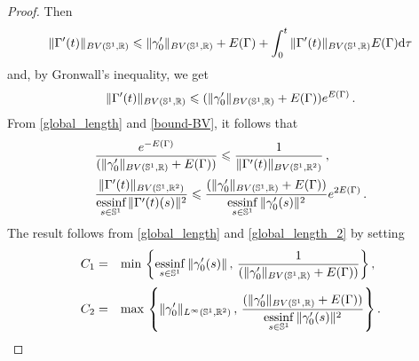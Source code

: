 \begin{proof}
Then
$$\|\Gamma'(t)\|_{BV(\mathbb{S}^1,\mathbb{R})}\leqslant  \|\gamma_0'\|_{BV(\mathbb{S}^1,\mathbb{R})}+E(\Gamma) +   \int_0^t \|\Gamma'(t)\|_{BV(\mathbb{S}^1,\mathbb{R})}E(\Gamma) \mathrm{d} \tau$$
and, by  Gronwall's inequality, we get 
\begin{equation}\label{bound-BV}
\|\Gamma'(t)\|_{BV(\mathbb{S}^1,\mathbb{R})}\leqslant (\|\gamma_0'\|_{BV(\mathbb{S}^1,\mathbb{R})}+E(\Gamma))e^{E(\Gamma)}\,.
\end{equation} 
From \eqref{global_length} and \eqref{bound-BV}, it follows  that 
\begin{equation}\label{global_length_2}
\begin{array}{ll}
\displaystyle{\frac{e^{-E(\GA) }}{ (\|\gm_0'\|_{BV(\Circ,\RR)}+E(\GA))}	\leq \frac{1}{\|\GA'(t)\|_{BV(\Circ,\RR^2)}}}\,, \vspace{0.2cm}\\
\displaystyle{\frac{\|\GA'(t)\|_{BV(\Circ,\RR^2)}}{\underset{s\in\Circ}{\mbox{essinf}}\,\|\GA'(t)(s)\|^2} \leq 	\frac{(\|\gm_0'\|_{BV(\Circ,\RR)}+E(\GA))}{\underset{s\in \Circ}{\rm{essinf}}\,\|\gm_0'(s)\|^2}}e^{2E(\GA)}\,.
\end{array}
\end{equation}
The result follows from \eqref{global_length} and \eqref{global_length_2} by setting
\begin{equation}\label{C1C2}
\begin{array}{ll}
C_1= &\displaystyle{ \min\, \left\{ \underset{s\in \Circ}{\rm{essinf}}\,\|\gm_0'(s)\|\,,\,\frac{1}{ (\|\gm_0'\|_{BV(\Circ,\RR)}+E(\GA))}\right\} }\,,\vspace{0.2cm}\\

C_2=& \displaystyle{
\max \, 
\left\{ \|\gm_0'\|_{\leb{\infty}}\, ,\, \frac{(\|\gm_0'\|_{BV(\Circ,\RR)}+E(\GA))}{\underset{s\in \Circ}{\rm{essinf}}\,\|\gm_0'(s)\|^2} 
\right\}}\,.

\end{array}
\end{equation}
\end{proof}



